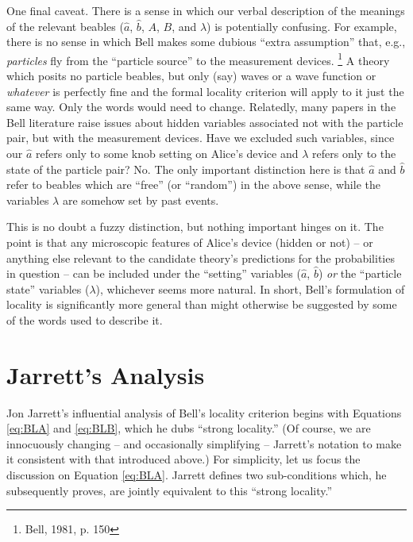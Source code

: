 \documentclass[aps,prc,twocolumn]{revtex4}
\begin{document}
One final caveat.  There is a sense in which our
verbal description of the meanings of the relevant beables ($\hat{a}$,
$\hat{b}$, $A$, $B$, and $\lambda$) is potentially confusing.  For
example, there is no sense in which Bell makes some dubious ``extra
assumption'' that, e.g., \emph{particles} fly from the ``particle
source'' to the measurement devices.   
\footnote{Bell, 1981, p. 150}
A theory which posits no
particle beables, but only (say) waves or a wave function or \emph{whatever}
is perfectly fine and the formal locality criterion
will apply to it just the same way.  Only the words would need to
change.  Relatedly, many papers in the Bell literature raise issues
about hidden variables associated not with the particle pair, but with
the measurement devices.  Have we excluded such variables, since our
$\hat{a}$ refers only to some knob setting on Alice's device and
$\lambda$ refers only to the state of the particle pair?  No.  The
only important distinction here is that $\hat{a}$ and $\hat{b}$ refer 
to beables which are ``free'' (or ``random'') in the above sense,
while the variables $\lambda$ are somehow set by past events.

This is no doubt a fuzzy distinction, but nothing important hinges on
it.  The point is that any
microscopic features of Alice's device (hidden or not)  -- or anything
else relevant to the candidate theory's predictions for the probabilities in
question -- can be included under the ``setting'' variables ($\hat{a}$,
$\hat{b}$) \emph{or} the ``particle state'' variables ($\lambda$),
whichever seems more natural.  In short, Bell's formulation of
locality is significantly more general than might otherwise be
suggested by some of the words used to describe it.





\section{Jarrett's Analysis}

Jon Jarrett's influential analysis of Bell's locality criterion 
begins with Equations \ref{eq:BLA} and \ref{eq:BLB}, which he dubs
``strong locality.''  (Of course, we are innocuously 
changing -- and occasionally
simplifying -- Jarrett's notation to make it consistent with that
introduced above.)  For simplicity, let us focus the discussion 
on Equation \ref{eq:BLA}.  Jarrett defines two sub-conditions which,
he subsequently proves, are jointly equivalent to this ``strong locality.''
\end{document}

